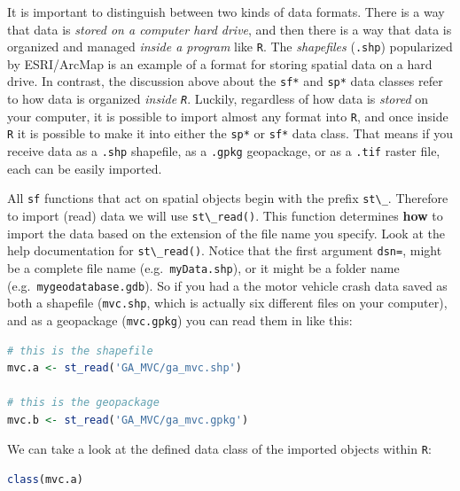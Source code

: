 \documentclass[
]{book}
\newcommand{\passthrough}[1]{#1}
\begin{document}
It is important to distinguish between two kinds of data formats. There is a way that data is \emph{stored on a computer hard drive}, and then there is a way that data is organized and managed \emph{inside a program} like \passthrough{\lstinline!R!}. The \emph{shapefiles} (\passthrough{\lstinline!.shp!}) popularized by ESRI/ArcMap is an example of a format for storing spatial data on a hard drive. In contrast, the discussion above about the \passthrough{\lstinline!sf*!} and \passthrough{\lstinline!sp*!} data classes refer to how data is organized \emph{inside \passthrough{\lstinline!R!}}. Luckily, regardless of how data is \emph{stored} on your computer, it is possible to import almost any format into \passthrough{\lstinline!R!}, and once inside \passthrough{\lstinline!R!} it is possible to make it into either the \passthrough{\lstinline!sp*!} or \passthrough{\lstinline!sf*!} data class. That means if you receive data as a \passthrough{\lstinline!.shp!} shapefile, as a \passthrough{\lstinline!.gpkg!} geopackage, or as a \passthrough{\lstinline!.tif!} raster file, each can be easily imported.

All \passthrough{\lstinline!sf!} functions that act on spatial objects begin with the prefix \passthrough{\lstinline!st\_!}. Therefore to import (read) data we will use \passthrough{\lstinline!st\_read()!}. This function determines \textbf{how} to import the data based on the extension of the file name you specify. Look at the help documentation for \passthrough{\lstinline!st\_read()!}. Notice that the first argument \passthrough{\lstinline!dsn=!}, might be a complete file name (e.g.~\passthrough{\lstinline!myData.shp!}), or it might be a folder name (e.g.~\passthrough{\lstinline!mygeodatabase.gdb!}). So if you had a the motor vehicle crash data saved as both a shapefile (\passthrough{\lstinline!mvc.shp!}, which is actually six different files on your computer), and as a geopackage (\passthrough{\lstinline!mvc.gpkg!}) you can read them in like this:

\begin{lstlisting}[language=R]
# this is the shapefile
mvc.a <- st_read('GA_MVC/ga_mvc.shp')

# this is the geopackage
mvc.b <- st_read('GA_MVC/ga_mvc.gpkg')
\end{lstlisting}

We can take a look at the defined data class of the imported objects within \passthrough{\lstinline!R!}:

\begin{lstlisting}[language=R]
class(mvc.a)
\end{lstlisting}
\end{document}
